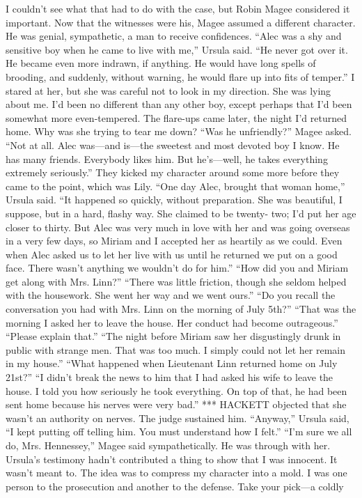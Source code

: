 \documentclass{novel}
\begin{document}

I couldn’t see what that had to do with the case, but Robin Magee considered it important. Now that the witnesses were his, Magee assumed a different character. He was genial, sympathetic, a man to receive confidences. “Alec was a shy and sensitive boy when he came to live with me,” Ursula said. “He never got over it. He became even more indrawn, if anything. He would have long spells of brooding, and suddenly, without warning, he would flare up into fits of temper.” I stared at her, but she was careful not to look in my direction. She was lying about me. I’d been no different than any other boy, except perhaps that I’d been somewhat more even-tempered. The flare-ups came later, the night I’d returned home. Why was she trying to tear me down? “Was he unfriendly?” Magee asked. “Not at all. Alec was—and is—the sweetest and most devoted boy I know. He has many friends. Everybody likes him. But he’s—well, he takes everything extremely seriously.” They kicked my character around some more before they came to the point, which was Lily. “One day Alec, brought that woman home,” Ursula said. “It happened so quickly, without preparation. She was beautiful, I suppose, but in a hard, flashy way. She claimed to be twenty- two; I’d put her age closer to thirty. But Alec was very much in love with her and was going overseas in a very few days, so Miriam and I accepted her as heartily as we could. Even when Alec asked us to let her live with us until he returned we put on a good face. There wasn’t anything we wouldn’t do for him.” “How did you and Miriam get along with Mrs. Linn?” “There was little friction, though she seldom helped with the housework. She went her way and we went ours.” “Do you recall the conversation you had with Mrs. Linn on the morning of July 5th?” “That was the morning I asked her to leave the house. Her conduct had become outrageous.” “Please explain that.” “The night before Miriam saw her disgustingly drunk in public with strange men. That was too much. I simply could not let her remain in my house.” “What happened when Lieutenant Linn returned home on July 21st?” “I didn’t break the news to him that I had asked his wife to leave the house. I told you how seriously he took everything. On top of that, he had been sent home because his nerves were very bad.” *** HACKETT objected that she wasn’t an authority on nerves. The judge sustained him. “Anyway,” Ursula said, “I kept putting off telling him. You must understand how I felt.” “I’m sure we all do, Mrs. Hennessey,” Magee said sympathetically. He was through with her. Ursula’s testimony hadn’t contributed a thing to show that I was innocent. It wasn’t meant to. The idea was to compress my character into a mold. I was one person to the prosecution and another to the defense. Take your pick—a coldly 
\end{document}
